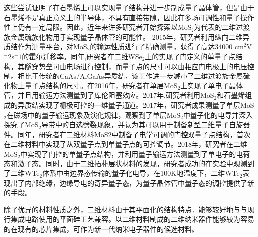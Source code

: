     这些尝试证明了在石墨烯上可以实现量子结构并进一步制成量子晶体管，但是由于石墨烯不是真正意义上的半导体，不具有直接带隙，因此在多场可调性和量子操作性上仍有一定局限。因此，近年来许多研究者开始探索以MoS$_2$为代表的二维过渡族金属硫族化物用于实现量子晶体管的可能性。
    2015年，研究者利用纵向二维异质结作为测量平台，对MoS$_2$的输运性质进行了精确测量，获得了高达34000 cm$^2$V$^-2$s$^-1$的霍尔迁移率。同年,研究者在二维WSe$_2$上的实现了门定义的单量子点结构，其隧穿势垒可由电场进行控制，而量子点的尺寸可以由相应门电极上的电压控制。相比于传统的GaAs/AlGaAs异质结，该工作进一步减小了二维过渡族金属硫化物上量子点结构的尺寸。在2016年，研究者在单层MoS$_2$上实现了单电子晶体管，并且用输运方法测量到了库伦阻塞效应。2017年,研究者利用MoS$_2$和石墨烯组成的异质结实现了栅极可控的一维量子通道。2017年，研究者成果测量了单层MoS$_2$在磁场中的量子输运现象及演化规律，观察到了单层MoS$_2$中量子化的电导并深入探究了MoS$_2$导带中的自选劈裂现象，并认为其可以用于制备新型二维量子自旋器件。同年，研究者在二维材料MoS2中制备了电学可调的门控双量子点结构，首次在二维材料中实现了从双量子点到单量子点的可控调节。2018年，研究者在二维MoS$_2$中实现了门控的单量子点结构，并利用量子输运方法测量到了单电子的电荷态和激子态。同时，由于二维拓朴层状材料的发现，研究者成功的在实验中观测到了二维WTe$_2$体系中由边界态传输的量子化电导，在100K地温度下，二维WTe$_2$表现出了内部绝缘，边缘导电的奇异量子态，为量子晶体管中量子态的调控提供了新的手段。

    除了优异的材料性质之外，二维材料由于其平面化的结构特点，能够较好地与与现行集成电路使用的平面硅工艺兼容。以二维材料制成的二维纳米器件能够较为容易的在现有的芯片集成，可作为新一代纳米电子器件的候选材料。

